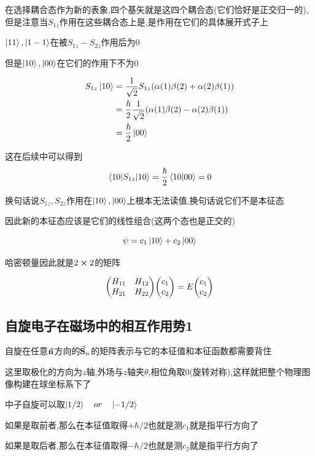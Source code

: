 \documentclass{article}
\begin{document}
            在选择耦合态作为新的表象,四个基矢就是这四个耦合态(它们恰好是正交归一的),但是注意当$S_{1z}$作用在这些耦合态上是,是作用在它们的具体展开式子上

            $ \ket{11},\ket{1-1} $在被$S_{1z} - S_{2z}$作用后为0

            但是$\ket{10},\ket{00}$在它们的作用下不为0

            \begin{align*}
                 S_{1z} \ket{10} &= \frac{1}{\sqrt{2}} S_{1z} (\alpha(1)\beta(2) + \alpha(2)\beta(1))    \\
                                 &= \frac{\hbar}{2} \frac{1}{\sqrt{2}} (\alpha(1)\beta(2) - \alpha(2)\beta(1))             \\
                                 &= \frac{\hbar}{2} \ket{00}
            \end{align*}
            
            这在后续中可以得到
            $$ \mel{10}{S_{1z}}{10} = \frac{\hbar}{2} \braket{10}{00} = 0 $$

            换句话说$S_{1z},S_{2z}$作用在$\ket{10},\ket{00}$上根本无法读值,换句话说它们不是本征态

            因此新的本征态应该是它们的线性组合(这两个态也是正交的)

            $$ \psi = c_{1} \ket{10} + c_{2} \ket{00} $$
            
            哈密顿量因此就是$2 \cross 2$的矩阵

            $$ \mqty( H_{11} & H_{12} \\ H_{21} & H_{22} ) \mqty(c_{1} \\ c_{2}) = E \mqty(c_{1} \\ c_{2}) $$

        \subsection{自旋电子在磁场中的相互作用势1}
            自旋在任意$\va{n}$方向的$\va{S}_{n}$的矩阵表示与它的本征值和本征函数都需要背住

            这里取极化的方向为$z$轴,外场与$z$轴夹$\theta$,相位角取0(旋转对称),这样就把整个物理图像构建在球坐标系下了

            中子自旋可以取$\ket{1/2} \quad or \quad \ket{-1/2} $

            如果是取前者,那么在本征值取得$+\hbar/2$也就是测$c_{1}$就是指平行方向了

            如果是取后者,那么在本征值取得$-\hbar/2$也就是测$c_{2}$就是指平行方向了
\end{document}
